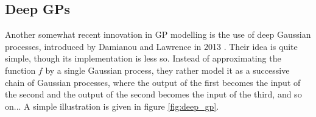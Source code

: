 \documentclass[a4paper,12pt]{article}
\begin{document}
\subsection{Deep GPs}
Another somewhat recent innovation in GP modelling is the use of deep Gaussian processes, introduced by Damianou and Lawrence in 2013 \cite{damianou2013}. Their idea is quite simple, though its implementation is less so. Instead of approximating the function $f$ by a single Gaussian process, they rather model it as a successive chain of Gaussian processes, where the output of the first becomes the input of the second and the output of the second becomes the input of the third, and so on... A simple illustration is given in figure \ref{fig:deep_gp}. 
\begin{figure}[H]
\begin{center}
\begin{minipage}[r]{.24\linewidth}
    \centering

\end{minipage}
\end{center}
\end{figure}
\end{document}
